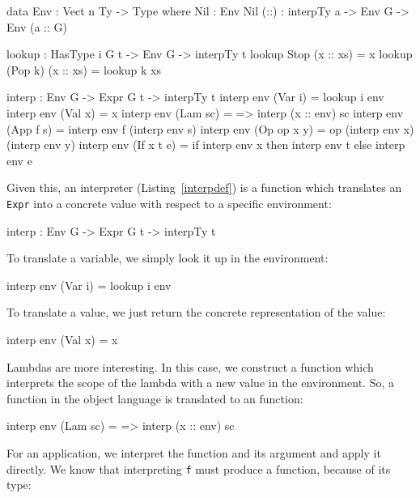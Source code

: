 \begin{code}
data Env : Vect n Ty -> Type where
    Nil  : Env Nil
    (::) : interpTy a -> Env G -> Env (a :: G)

lookup : HasType i G t -> Env G -> interpTy t
lookup Stop    (x :: xs) = x
lookup (Pop k) (x :: xs) = lookup k xs
\end{code}

\begin{code}[caption={Intepreter definition},label=interpdef]
interp : Env G -> Expr G t -> interpTy t
interp env (Var i)     = lookup i env
interp env (Val x)     = x
interp env (Lam sc)    = \x => interp (x :: env) sc
interp env (App f s)   = interp env f (interp env s)
interp env (Op op x y) = op (interp env x) (interp env y)
interp env (If x t e)  = if interp env x then interp env t
                                         else interp env e
\end{code}

\noindent
Given this, an interpreter (Listing~\ref{interpdef}) is a function which translates an \texttt{Expr} into a concrete \Idris{} value with respect to a specific environment:

\begin{code}
interp : Env G -> Expr G t -> interpTy t
\end{code}

\noindent
To translate a variable, we simply look it up in the environment:

\begin{code}
interp env (Var i) = lookup i env
\end{code}

\noindent
To translate a value, we just return the concrete representation of the value:

\begin{code}
interp env (Val x) = x
\end{code}

\noindent
Lambdas are more interesting.
In this case, we construct a function which interprets the scope of the lambda with a new value in the environment.
So, a function in the object language is translated to an \Idris{} function:

\begin{code}
interp env (Lam sc) = \x => interp (x :: env) sc
\end{code}

\noindent
For an application, we interpret the function and its argument and apply it directly.
We know that interpreting \texttt{f} must produce a function, because of its type:

